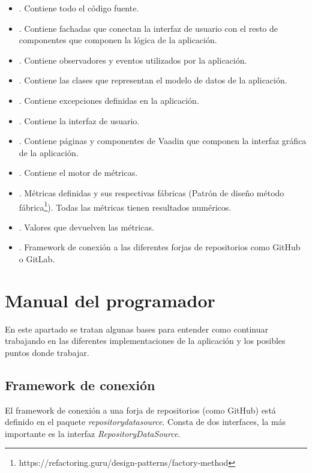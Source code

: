 \begin{itemize}
	\item {}. Contiene todo el código fuente.
	\item {}. Contiene fachadas que conectan la interfaz de usuario con el resto de componentes que componen la lógica de la aplicación.
	\item {}. Contiene observadores y eventos utilizados por la aplicación.
	\item {}. Contiene las clases que representan el modelo de datos de la aplicación.
	\item {}. Contiene excepciones definidas en la aplicación.
	\item {}. Contiene la interfaz de usuario.
	\item {}. Contiene páginas y componentes de Vaadin que componen la interfaz gráfica de la aplicación.
	\item {}. Contiene el motor de métricas.
	\item {}. Métricas definidas y sus respectivas fábricas (Patrón de diseño método fábrica\footnote{https://refactoring.guru/design-patterns/factory-method}). Todas las métricas tienen resultados numéricos.
	\item {}. Valores que devuelven las métricas.
	\item {}. Framework de conexión a las diferentes forjas de repositorios como GitHub o GitLab.
\end{itemize}

\section{Manual del programador}
En este apartado se tratan algunas bases para entender como continuar trabajando en las diferentes implementaciones de la aplicación y los posibles puntos donde trabajar.

\subsection{Framework de conexión}
El framework de conexión a una forja de repositorios (como GitHub) está definido en el paquete \textit{repositorydatasource}. Consta de dos interfaces, la más importante es la interfaz \textit{RepositoryDataSource}.


